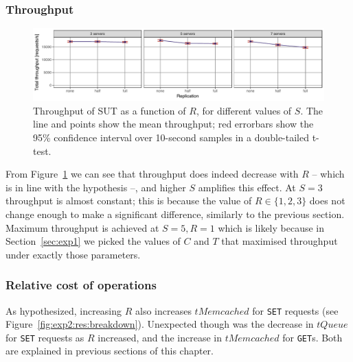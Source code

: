 \documentclass[11pt]{article}
\newcommand{\get}[0]{\texttt{GET}}
\newcommand{\set}[0]{\texttt{SET}}
\begin{document}
\subsubsection{Throughput}

\begin{figure}[h]
\centering
\includegraphics[width=\textwidth]{../results/replication/graphs/tp_vs_replication_all.pdf}
\caption{Throughput of SUT as a function of $R$, for different values of $S$. The line and points show the mean throughput; red errorbars show the 95\% confidence interval over 10-second samples in a double-tailed t-test.}
\label{fig:exp2:res:throughput}
\end{figure}

From Figure~\ref{fig:exp2:res:throughput} we can see that throughput does indeed decrease with $R$ -- which is in line with the hypothesis --, and higher $S$ amplifies this effect. At $S=3$ throughput is almost constant; this is because the value of $R \in \{1,2,3\}$ does not change enough to make a significant difference, similarly to the previous section. Maximum throughput is achieved at $S=5, R=1$ which is likely because in Section~\ref{sec:exp1} we picked the values of $C$ and $T$ that maximised throughput under exactly those parameters.

\subsubsection{Relative cost of operations}
As hypothesized, increasing $R$ also increases $tMemcached$ for \set{} requests (see Figure~\ref{fig:exp2:res:breakdown}). Unexpected though was the decrease in $tQueue$ for \set{} requests as $R$ increased, and the increase in $tMemcached$ for \get{}s. Both are explained in previous sections of this chapter.
\end{document}
